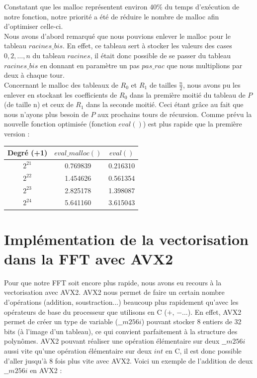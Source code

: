 \documentclass[12pt, a4paper]{article}
\begin{document}
Constatant que les malloc représentent environ 40\% du temps d'exécution de notre fonction, notre priorité a été de réduire le nombre de malloc afin d'optimiser celle-ci.  \\
Nous avons d'abord remarqué que nous pouvions enlever le malloc pour le tableau $racines\_bis$. En effet, ce tableau sert à stocker les valeurs des cases $0,2,\dots,n$ du tableau $racines$, il était donc possible de se passer du tableau $racines\_bis$ en donnant en paramètre un pas $pas\_rac$ que nous multiplions par deux à chaque tour. \\
Concernant le malloc des tableaux de $R_0$ et $R_1$ de tailles $\frac{n}{2}$, nous avons pu les enlever en stockant les coefficients de $R_0$ dans la première moitié du tableau de $P$ (de taille n) et ceux de $R_1$ dans la seconde moitié. Ceci étant grâce au fait que nous n'ayons plus besoin de $P$ aux prochains tours de récursion.
Comme prévu la nouvelle fonction optimisée (fonction $eval()$) est plus rapide que la première version :

\begin{center}
\begin{tabular}{||c c c||}
\hline
Degré (+1) & $eval\_malloc()$ & $eval()$ \\
\hline\hline
$2^{21}$ & 0.769839 & 0.216310 \\
\hline
$2^{22}$ & 1.454626 & 0.561354 \\
\hline
$2^{23}$ & 2.825178 & 1.398087 \\
\hline
$2^{24}$ & 5.641160 & 3.615043 \\
\hline
\end{tabular}
\end{center}

\newpage

\section{Implémentation de la vectorisation dans la FFT avec AVX2}

Pour que notre FFT soit encore plus rapide, nous avons eu recours à la vectorisation avec AVX2. AVX2 nous permet de faire un certain nombre d'opérations (addition, soustraction...) beaucoup plus rapidement qu'avec les opérateurs de base du processeur que utilisons en C ($+$, $-$...). En effet, AVX2 permet de créer un type de variable ($\_\_m256i$) pouvant stocker 8 entiers de 32 bits (à l'image d'un tableau), ce qui convient parfaitement à la structure des polynômes. AVX2 pouvant réaliser une opération élémentaire sur deux $\_\_m256i$ aussi vite qu'une opération élémentaire sur deux $int$ en C, il est donc possible d'aller jusqu'à 8 fois plus vite avec AVX2. Voici un exemple de l'addition de deux $\_\_m256i$ en AVX2 : 
\end{document}
